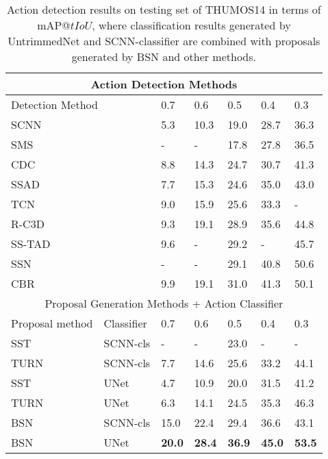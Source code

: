 \documentclass[runningheads]{llncs}
\begin{document}
\begin{table}[tbp]
\setlength{\abovecaptionskip}{0.1cm} %
\setlength{\belowcaptionskip}{-0.3cm} %
\centering
\caption{Action detection results on testing set of THUMOS14 in terms of mAP@$tIoU$, where classification results generated by UntrimmedNet \cite{wang2017untrimmednets} and  SCNN-classifier \cite{shou2016action} are combined with proposals generated by BSN and other  methods. }

\begin{tabular}{p{2.4cm}p{1.6cm}p{1.2cm}<{\centering}p{1.2cm}<{\centering}p{1.2cm}<{\centering}p{1.2cm}<{\centering}p{1.2cm}<{\centering}}
\toprule
\multicolumn{7}{c}{  Action Detection Methods }  \\
\hline
\multicolumn{2}{l}{  Detection Method } & 0.7 & 0.6 & 0.5 & 0.4 & 0.3  \\
\hline
\multicolumn{2}{l}{  SCNN \cite{shou2016action} } & 5.3 & 10.3 &  19.0 & 28.7 & 36.3 \\
\multicolumn{2}{l}{  SMS \cite{yuan2017temporal} } & - & - & 17.8 &  27.8 &  36.5 \\
\multicolumn{2}{l}{  CDC \cite{shou2017cdc} } & 8.8 & 14.3 &  24.7 & 30.7 & 41.3  \\
\multicolumn{2}{l}{  SSAD \cite{ssad} } & 7.7 & 15.3 & 24.6 &  35.0 &  43.0 \\
\multicolumn{2}{l}{  TCN \cite{dai2017temporal} } & 9.0 & 15.9 & 25.6 &  33.3 &  - \\
\multicolumn{2}{l}{  R-C3D \cite{xu2017r} } & 9.3 & 19.1 &  28.9 & 35.6 & 44.8 \\
\multicolumn{2}{l}{  SS-TAD \cite{sstad} } & 9.6 & - &  29.2 & - & 45.7 \\
\multicolumn{2}{l}{  SSN  \cite{xiong2017pursuit} } & - & - & 29.1 & 40.8 & 50.6 \\
\multicolumn{2}{l}{  CBR \cite{gao2017cascaded} } & 9.9 & 19.1 &  31.0 & 41.3 & 50.1 \\
\hline
\multicolumn{7}{c}{   Proposal Generation Methods + Action Classifier }  \\
\hline
Proposal method & Classifier & 0.7 & 0.6 & 0.5 & 0.4 & 0.3  \\
\hline
SST \cite{sst_buch_cvpr17} & SCNN-cls 	& - & - & 23.0 & - &  -\\
TURN \cite{gao2017turn} & SCNN-cls 		& 7.7 & 14.6 & 25.6 & 33.2 &  44.1\\
SST \cite{sst_buch_cvpr17} & UNet 		& 4.7 & 10.9 & 20.0 & 31.5 &  41.2\\
TURN \cite{gao2017turn} & UNet 			& 6.3 & 14.1 & 24.5 & 35.3 &  46.3\\
\hline
BSN & SCNN-cls & 15.0 & 22.4 & 29.4 & 36.6 &   43.1\\
BSN & UNet & {\bf 20.0} & {\bf 28.4} & {\bf 36.9} & {\bf 45.0} &  {\bf 53.5}\\
\bottomrule
\end{tabular}
\label{table_detection_thumos}
\normalsize
\end{table}
\end{document}
